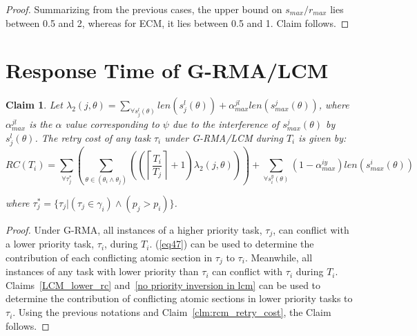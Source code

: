 \documentclass[12pt,english]{report}
\newtheorem{clm}{Claim}
\newtheorem{proof}{Proof}
\begin{document}
\begin{proof}
Summarizing from the previous cases, the upper bound on $s_{max}/r_{max}$
lies between 0.5 and 2, whereas for ECM,
it lies between 0.5 and 1. Claim follows.

\end{proof}

\section{Response Time of G-RMA/LCM}
\label{rma}

\begin{clm}\label{response g-rma/lcm}
Let $\lambda_{2}(j,\theta)=\sum_{\forall s_{j}^{l}(\theta)}len(s_{j}^{l}(\theta))+\alpha_{max}^{jl}len(s_{max}^{j}(\theta))$, where $\alpha_{max}^{jl}$ is the $\alpha$ value corresponding to $\psi$ due to the interference of $s_{max}^j(\theta)$ by $s_j^l(\theta)$. The retry cost of any task $\tau_i$ under G-RMA/LCM during $T_i$ 
is given by:
\begin{equation}
RC\left(T_i\right) = \sum_{\forall\tau_{j}^{*}}\left(\sum_{\theta\in(\theta_{i}\wedge\theta_{j})}\left(\left(\left\lceil\frac{T_i}{T_{j}}\right\rceil +1\right)\lambda_{2}(j,\theta)\right)\right) + \sum_{\forall s_{i}^{y}(\theta)}\left(1-\alpha_{max}^{iy}\right)len\left(s_{max}^i(\theta)\right)
\label{eq60}
\end{equation}

where $\tau_{j}^{*}=\{\tau_{j}|(\tau_{j}\in\gamma_{i})\wedge(p_{j}>p_{i})\}$.
\end{clm}

\begin{proof}\normalfont
Under G-RMA, all instances of a higher priority task, $\tau_{j}$, can conflict with a lower priority task,
$\tau_{i}$, during $T_{i}$. (\ref{eq47}) can be used to determine the contribution of each conflicting atomic section in $\tau_j$ to $\tau_i$. Meanwhile, all instances of any task with lower priority than $\tau_{i}$ can conflict with $\tau_i$ during $T_{i}$. Claims~\ref{LCM_lower_rc} and~\ref{no priority inversion in lcm} can be used to determine the contribution of conflicting atomic sections in lower priority tasks to $\tau_i$.
%
Using the previous notations and Claim~\ref{clm:rcm_retry_cost}, the Claim follows.
\end{proof}
\end{document}
